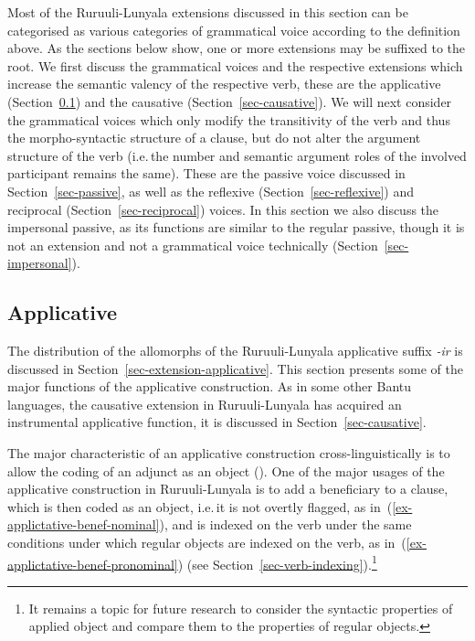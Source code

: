 Most of the Ru\-ruu\-li\hyp{}Lu\-nya\-la extensions discussed in this section can be categorised as various categories of grammatical voice according to the definition above. 
As the sections below show, one or more extensions may be suffixed to the root. 
We first discuss the grammatical voices and the respective extensions which increase the semantic valency of the respective verb, these are the applicative (Section~\ref{sec-applicative}) and the causative (Section~\ref{sec-causative}). 
We will next consider the grammatical voices which only modify the transitivity of the verb and thus the morpho-syntactic structure of a clause, but do not alter the argument structure of the verb (i.e.\,the number and semantic argument roles of the involved participant remains the same). 
These are the passive voice discussed in Section~\ref{sec-passive}, as well as the reflexive (Section~\ref{sec-reflexive}) and reciprocal (Section~\ref{sec-reciprocal}) voices. 
In this section we also discuss the impersonal passive, as its functions are similar to the regular passive, though it is not an extension and not a grammatical voice technically (Section~\ref{sec-impersonal}).


\subsection{Applicative}\label{sec-applicative}

The distribution of the allomorphs of the  Ru\-ruu\-li\hyp{}Lu\-nya\-la applicative suffix \emph{-ir} is discussed in  Section~\ref{sec-extension-applicative}. 
This section presents some of the major functions of the applicative construction. 
As in some other Bantu languages, the causative extension in Ru\-ruu\-li\hyp{}Lu\-nya\-la has acquired an instrumental applicative function, it is discussed in Section~\ref{sec-causative}. 

The major characteristic of an applicative construction cross-lingui\-sti\-cally is to allow the coding of an  adjunct as an object (\citealt[1]{Peterson2006Applicative}). 
One of the major usages of the applicative construction in Ruruuli-Lu\-nya\-la is to add a beneficiary to a clause, which is then coded as an object, i.e.\,it is not overtly flagged, as in~(\ref{ex-applictative-benef-nominal}), and is indexed on the verb under the same conditions under which regular objects are indexed on the verb, as in~(\ref{ex-applictative-benef-pronominal}) (see Section~\ref{sec-verb-indexing}).\footnote{It remains a topic for future research to consider the syntactic properties of applied object and compare them to the properties of regular objects.}

